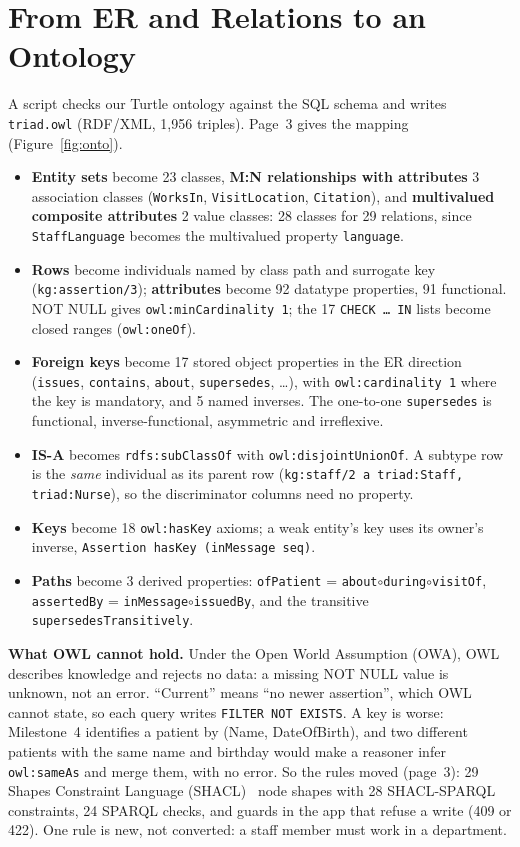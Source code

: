 \documentclass[sigconf]{acmart}
\newcommand{\tw}[1]{\texttt{#1}}
\begin{document}
\section{From ER and Relations to an Ontology}\label{sec:onto}
A script checks our Turtle ontology against the SQL schema and writes \tw{triad.owl} (RDF/XML, 1,956 triples). Page~3 gives the mapping (Figure~\ref{fig:onto}).
{\sloppy\setlength{\leftmargini}{1em}\begin{itemize}\setlength{\itemsep}{0pt}
\item \textbf{Entity sets} become 23 classes, \textbf{M:N relationships with attributes} 3 association classes (\tw{WorksIn}, \tw{VisitLocation}, \tw{Citation}), and \textbf{multivalued composite attributes} 2 value classes: 28 classes for 29 relations, since \tw{StaffLanguage} becomes the multivalued property \tw{language}.
\item \textbf{Rows} become individuals named by class path and surrogate key (\tw{kg:assertion/3}); \textbf{attributes} become 92 datatype properties, 91 functional. NOT NULL gives \tw{owl:minCardinality 1}; the 17 \tw{CHECK \dots\ IN} lists become closed ranges (\tw{owl:oneOf}).
\item \textbf{Foreign keys} become 17 stored object properties in the ER direction (\tw{issues}, \tw{contains}, \tw{about}, \tw{supersedes}, \dots), with \tw{owl:cardinality 1} where the key is mandatory, and 5 named inverses. The one-to-one \tw{supersedes} is functional, inverse-functional, asymmetric and irreflexive.
\item \textbf{IS-A} becomes \tw{rdfs:subClassOf} with \tw{owl:disjointUnionOf}. A subtype row is the \emph{same} individual as its parent row (\tw{kg:staff/2 a triad:Staff, triad:Nurse}), so the discriminator columns need no property.
\item \textbf{Keys} become 18 \tw{owl:hasKey} axioms; a weak entity's key uses its owner's inverse, \tw{Assertion hasKey (inMessage seq)}.
\item {\raggedright \textbf{Paths} become 3 derived properties: \tw{ofPatient} = \tw{about}$\circ$\tw{during}$\circ$\tw{visitOf}, \tw{assertedBy} = \tw{inMessage}$\circ$\tw{issuedBy}, and the transitive \tw{supersedesTransitively}.\par}
\end{itemize}}

\textbf{What OWL cannot hold.} Under the Open World Assumption (OWA), OWL describes knowledge and rejects no data: a missing NOT NULL value is unknown, not an error. ``Current'' means ``no newer assertion'', which OWL cannot state, so each query writes \tw{FILTER NOT EXISTS}. A key is worse: Milestone~4 identifies a patient by (Name, DateOfBirth), and two different patients with the same name and birthday would make a reasoner infer \tw{owl:sameAs} and merge them, with no error. So the rules moved (page~3): 29 Shapes Constraint Language (SHACL)~\cite{shacl} node shapes with 28 SHACL-SPARQL constraints, 24 SPARQL checks, and guards in the app that refuse a write (409 or 422). One rule is new, not converted: a staff member must work in a department.
\end{document}
